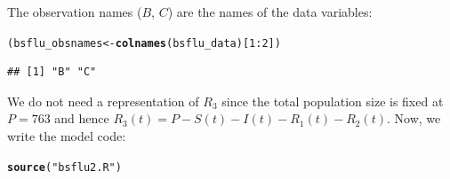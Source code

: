\documentclass{beamer}\usepackage[]{graphicx}\usepackage[]{color}
\makeatletter
\newcommand{\hlnum}[1]{\textcolor[rgb]{0.686,0.059,0.569}{#1}}%
\newcommand{\hlstr}[1]{\textcolor[rgb]{0.192,0.494,0.8}{#1}}%
\newcommand{\hlopt}[1]{\textcolor[rgb]{0,0,0}{#1}}%
\newcommand{\hlstd}[1]{\textcolor[rgb]{0.345,0.345,0.345}{#1}}%
\newcommand{\hlkwb}[1]{\textcolor[rgb]{0.69,0.353,0.396}{#1}}%
\newcommand{\hlkwd}[1]{\textcolor[rgb]{0.737,0.353,0.396}{\textbf{#1}}}%
\newenvironment{kframe}{%
 \def\at@end@of@kframe{}%
 \ifinner\ifhmode%
  \def\at@end@of@kframe{\end{minipage}}%
  \begin{minipage}{\columnwidth}%
 \fi\fi%
 \def\FrameCommand##1{\hskip\@totalleftmargin \hskip-\fboxsep
 \colorbox{shadecolor}{##1}\hskip-\fboxsep
     \hskip-\linewidth \hskip-\@totalleftmargin \hskip\columnwidth}%
 \MakeFramed {\advance\hsize-\width
   \@totalleftmargin\z@ \linewidth\hsize
   \@setminipage}}%
 {\par\unskip\endMakeFramed%
 \at@end@of@kframe}
\newenvironment{knitrout}{}{} %
\makeatother
\begin{document}
\begin{frame}[fragile]



The observation names ($B$, $C$) are the names of the data variables:

\begin{knitrout}\small
{}\color{fgcolor}\begin{kframe}
\begin{alltt}
\hlstd{(bsflu_obsnames} \hlkwb{<-} \hlkwd{colnames}\hlstd{(bsflu_data)[}\hlnum{1}\hlopt{:}\hlnum{2}\hlstd{])}
\end{alltt}
\begin{verbatim}
## [1] "B" "C"
\end{verbatim}
\end{kframe}
\end{knitrout}

We do not need a representation of $R_3$ since the total population size is fixed at $P=763$ and hence $R_3(t)=P-S(t)-I(t)-R_1(t)-R_2(t)$. 
Now, we write the model code:

\begin{knitrout}\small
{}\color{fgcolor}\begin{kframe}
\begin{alltt}
\hlkwd{source}\hlstd{(}\hlstr{"bsflu2.R"}\hlstd{)}
\end{alltt}
\end{kframe}
\end{knitrout}

\end{frame}
\end{document}
